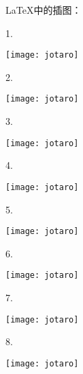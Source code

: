 \documentclass{ctexart}
\begin{document}
	\LaTeX{}中的插图：
	
	1.
	
	\texttt{[image: jotaro]}
	
	2.
	
	\texttt{[image: jotaro]}%
	
	3.
	
	\texttt{[image: jotaro]}%
	
	4.
	
	\texttt{[image: jotaro]}%
	
	5.
	
	\texttt{[image: jotaro]}%
	
	6.
	
	\texttt{[image: jotaro]}%
	
	7.
	
	\texttt{[image: jotaro]}
	
	8.
	
	\texttt{[image: jotaro]}
\end{document}
